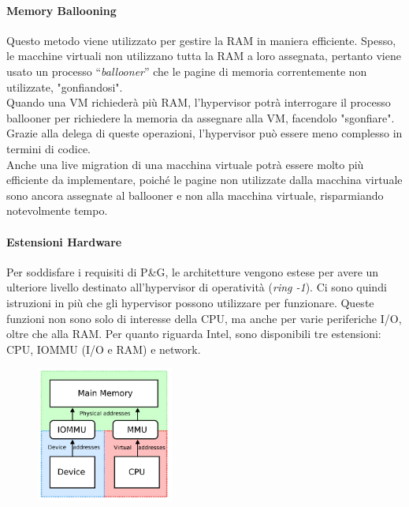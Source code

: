 \documentclass{article}
\begin{document}
		\paragraph{Memory Ballooning}
		Questo metodo viene utilizzato per gestire la RAM in maniera efficiente. Spesso, le
		macchine virtuali non utilizzano tutta la RAM a loro assegnata, pertanto viene usato un
		processo “\emph{ballooner}” che le pagine di memoria correntemente non utilizzate, "gonfiandosi".\\
		Quando una VM richiederà più RAM, l’hypervisor potrà interrogare il processo
		ballooner per richiedere la memoria da assegnare alla VM, facendolo "sgonfiare". Grazie alla delega di queste operazioni, l'hypervisor può essere meno complesso in termini di codice.\\
		
		Anche una live migration di una macchina virtuale potrà essere molto più efficiente da
		implementare, poiché le pagine non utilizzate dalla macchina virtuale sono ancora
		assegnate al ballooner e non alla macchina virtuale, risparmiando notevolmente tempo.
		
		\paragraph{Estensioni Hardware}
		Per soddisfare i requisiti di P\&G, le architetture vengono estese per avere un ulteriore livello destinato all'hypervisor di operatività (\emph{ring -1}). Ci sono quindi istruzioni in più che gli hypervisor possono utilizzare per funzionare. Queste funzioni non sono solo di interesse della CPU, ma anche per varie periferiche I/O, oltre che alla RAM.
		Per quanto riguarda Intel, sono disponibili tre estensioni: CPU, IOMMU (I/O e RAM) e network.
		
		\begin{figure}[ht]
			\centering
			\includegraphics[width=0.4\textwidth]{SAC_B1_virtualizationIO_HW.png} %
		\end{figure}
		
\end{document}
